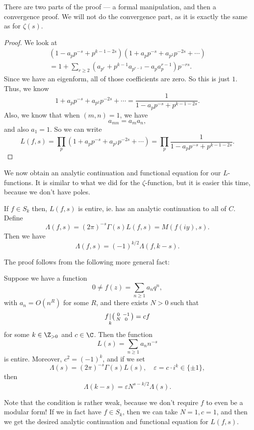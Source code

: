 \documentclass[a4paper]{article}
\begin{document}
There are two parts of the proof --- a formal manipulation, and then a convergence proof. We will not do the convergence part, as it is exactly the same as for $\zeta(s)$.
\begin{proof}
  We look at
  \begin{multline*}
    (1 - a_p p^{-s} + p^{k - 1 - 2s}) (1 + a_p p^{-s} + a_{p^2} p^{-2s} + \cdots) \\
    = 1 + \sum_{r \geq 2} (a_{p^r} + p^{k - 1} a_{p^{r - 2}} - a_p a_p^{r - 1}) p^{-rs}.
  \end{multline*}
  Since we have an eigenform, all of those coefficients are zero. So this is just $1$. Thus, we know
  \[
    1 + a_p p^{-s} + a_{p^2} p^{-2s} + \cdots = \frac{1}{1 - a_p p^{-s} + p^{k - 1 - 2s}}.
  \]
  Also, we know that when $(m, n) = 1$, we have
  \[
    a_{mn} = a_m a_n,
  \]
  and also $a_1 = 1$. So we can write
  \[
    L(f, s) = \prod_p (1 + a_p p^{-s} + a_{p^2} p^{-2s} + \cdots) = \prod_p \frac{1}{1 - a_p p^{-s} + p^{k - 1 - 2s}}.
  \]
\end{proof}

We now obtain an analytic continuation and functional equation for our $L$-functions. It is similar to what we did for the $\zeta$-function, but it is easier this time, because we don't have poles.
\begin{thm}
  If $f \in S_k$ then, $L(f, s)$ is entire, ie. has an analytic continuation to all of $C$. Define
  \[
    \Lambda(f, s) = (2\pi)^{-s} \Gamma(s) L(f, s) = M(f(iy), s).
  \]
  Then we have
  \[
    \Lambda(f, s) = (-1)^{k/2} \Lambda(f, k - s).
  \]
\end{thm}

The proof follows from the following more general fact:
\begin{thm}
  Suppose we have a function
  \[
    0 \not= f(z) = \sum_{n \geq 1} a_n q^n,
  \]
  with $a_n = O(n^R)$ for some $R$, and there exists $N > 0$ such that
  \[
    f\underset{k}{|}
    \begin{psmallmatrix}
      0 & -1\\
      N & 0
    \end{psmallmatrix} = cf
  \]
  for some $k \in \Z_{> 0}$ and $c \in \C$. Then the function
  \[
    L(s) = \sum_{n \geq 1} a_n n^{-s}
  \]
  is entire. Moreover, $c^2 = (-1)^k$, and if we set
  \[
    \Lambda(s) = (2\pi)^{-s} \Gamma(s) L(s), \quad \varepsilon = c \cdot i^k \in \{\pm 1\},
  \]
  then
  \[
    \Lambda(k - s) = \varepsilon N^{s - k/2} \Lambda(s).
  \]
\end{thm}
Note that the condition is rather weak, because we don't require $f$ to even be a modular form! If we in fact have $f \in S_k$, then we can take $N = 1, c = 1$, and then we get the desired analytic continuation and functional equation for $L(f, s)$.
\end{document}
